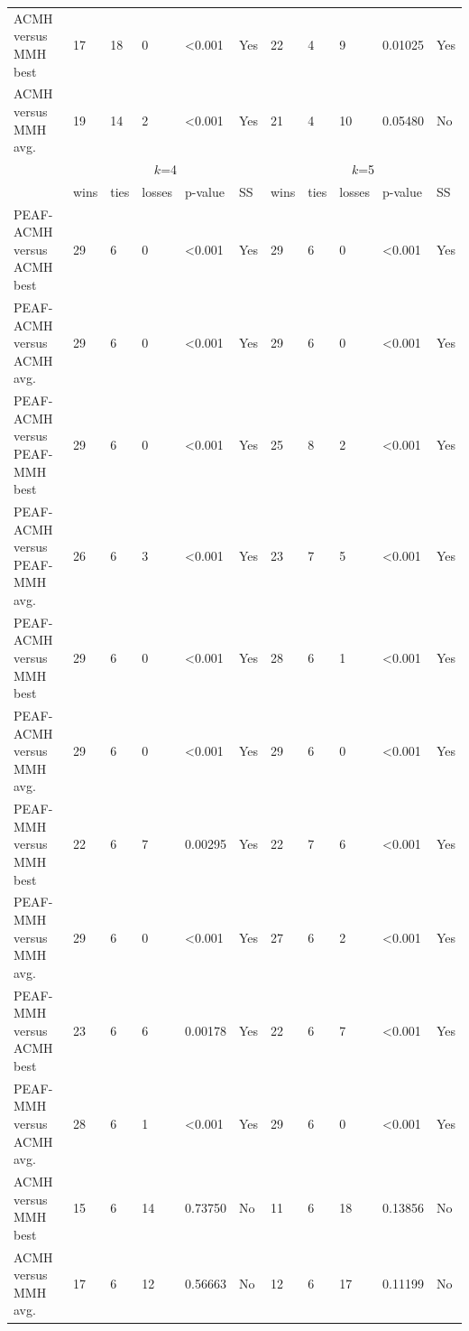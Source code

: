 \documentclass[12pt, a4paper]{article}%
\numberwithin{equation}{section}
\theoremstyle{plain}
\begin{document}
{\begin{landscape}
\begin{longtable}{|l|lllll|lllll|}
							ACMH versus MMH best                   & 17   & 18   & 0      & \textless{}0.001 & Yes & 22   & 4    & 9      & 0.01025          & Yes \\
							ACMH versus MMH avg.                   & 19   & 14   & 2      & \textless{}0.001 & Yes & 21   & 4    & 10     & 0.05480          & No  \\ \hline
							\multicolumn{1}{|c|}{\multirow{2}{*}{}} & \multicolumn{5}{c|}{$k$=4}                    & \multicolumn{5}{c|}{$k$=5}                    \\ \cline{2-11} 
							\multicolumn{1}{|c|}{}                  & wins & ties & losses & p-value          & SS  & wins & ties & losses & p-value          & SS  \\ \hline
							PEAF-ACMH versus ACMH best             & 29   & 6    & 0      & \textless{}0.001 & Yes & 29   & 6    & 0      & \textless{}0.001 & Yes \\
							PEAF-ACMH versus ACMH avg.             & 29   & 6    & 0      & \textless{}0.001 & Yes & 29   & 6    & 0      & \textless{}0.001 & Yes \\
							PEAF-ACMH versus PEAF-MMH best           & 29   & 6    & 0      & \textless{}0.001 & Yes & 25   & 8    & 2      & \textless{}0.001 & Yes \\
							PEAF-ACMH versus PEAF-MMH avg.           & 26   & 6    & 3      & \textless{}0.001 & Yes & 23   & 7    & 5      & \textless{}0.001 & Yes \\
							PEAF-ACMH versus MMH best               & 29   & 6    & 0      & \textless{}0.001 & Yes & 28   & 6    & 1      & \textless{}0.001 & Yes \\
							PEAF-ACMH versus MMH avg.               & 29   & 6    & 0      & \textless{}0.001 & Yes & 29   & 6    & 0      & \textless{}0.001 & Yes \\
							PEAF-MMH versus MMH best                 & 22   & 6    & 7      & 0.00295          & Yes & 22   & 7    & 6      & \textless{}0.001 & Yes \\
							PEAF-MMH versus MMH avg.                 & 29   & 6    & 0      & \textless{}0.001 & Yes & 27   & 6    & 2      & \textless{}0.001 & Yes \\
							PEAF-MMH versus ACMH best               & 23   & 6    & 6      & 0.00178          & Yes & 22   & 6    & 7      & \textless{}0.001 & Yes \\
							PEAF-MMH versus ACMH avg.               & 28   & 6    & 1      & \textless{}0.001 & Yes & 29   & 6    & 0      & \textless{}0.001 & Yes \\
							ACMH versus MMH best                   & 15   & 6    & 14     & 0.73750          & No  & 11   & 6    & 18     & 0.13856         & No  \\
							ACMH versus MMH avg.                   & 17   & 6    & 12     & 0.56663          & No  & 12   & 6    & 17     & 0.11199         & No  \\ \hline
						\end{longtable}
					\end{landscape}
				}
				
\end{document}
